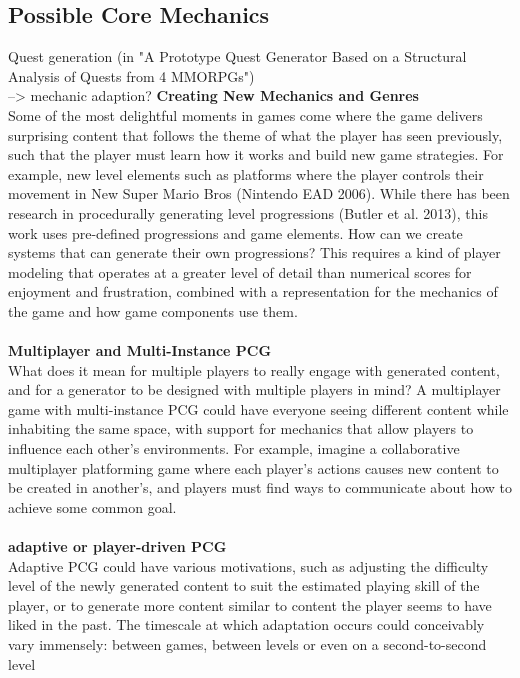 \documentclass[MGS,Master,english]{twbook}%
\begin{document}
\subsection{Possible Core Mechanics}
Quest generation (in "A Prototype Quest Generator Based on a Structural Analysis of Quests from 4 MMORPGs")\\
--> mechanic adaption?
\textbf{Creating New Mechanics and Genres} \cite{pcg::futureOfPcgInGames} \\
Some of the most delightful moments in games come where the game delivers surprising content that follows the theme of what the player has seen previously, such that the player must learn how it works and build new game strategies. For example, new level elements such as platforms where the player controls their movement in New Super Mario Bros (Nintendo EAD 2006). While there has been research in procedurally generating level progressions (Butler et al. 2013), this work uses pre-defined progressions and game elements. How can we create systems that can generate their own progressions? This requires a kind of player modeling that operates at a greater level of detail than numerical scores for enjoyment and frustration, combined with a representation for the mechanics of the game and how game components use them. \cite{pcg::futureOfPcgInGames}\\
\\
\textbf{Multiplayer and Multi-Instance PCG} \cite{pcg::futureOfPcgInGames}\\
What does it mean for multiple players to really engage with generated content, and for a generator to be designed with multiple players in mind? A multiplayer game with multi-instance PCG could have everyone seeing different content while inhabiting the same space, with support for mechanics that allow players to influence each other’s environments. For example, imagine a collaborative multiplayer platforming game where each player’s actions causes new content to be created in another’s, and players must find ways to communicate about how to achieve some common goal. \cite{pcg::futureOfPcgInGames} \\
\\
\textbf{adaptive or player-driven PCG} \cite{pcg::whatIsPCG}\\
Adaptive PCG could have various motivations, such as adjusting the difficulty level of the newly generated content to suit the estimated playing skill of the player, or to generate more content similar to content the player seems to have liked in the past. The timescale at which adaptation occurs could conceivably vary immensely: between games, between levels or even on a second-to-second level \cite{pcg::whatIsPCG}
\end{document}
